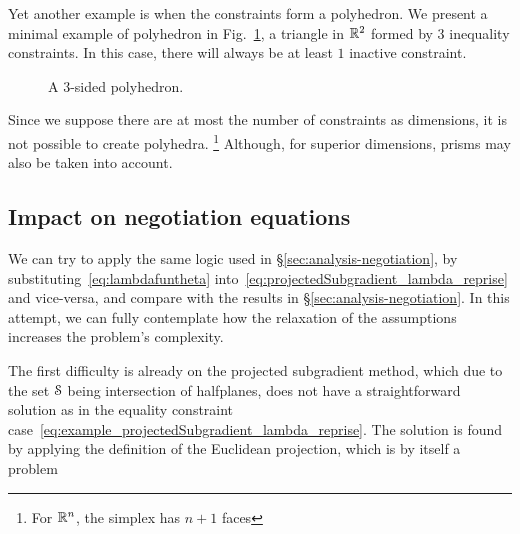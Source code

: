 \documentclass[../main.tex]{subfiles}
\begin{document}
Yet another example is when the constraints form a polyhedron.
We present a minimal example of polyhedron in Fig.~\ref{fig:triangle_inequality}, a triangle in $\mathbb{R}^{2}$ formed by $3$ inequality constraints.
In this case, there will always be at least $1$ inactive constraint.
\begin{figure}[h]
  \centering
  \caption{A $3$-sided polyhedron.}\label{fig:triangle_inequality}
\end{figure}

Since we suppose there are at most the number of constraints as dimensions, it is not possible to create polyhedra.
\footnote{For $\mathbb{R}^{n}$, the simplex has $n+1$ faces}
Although, for superior dimensions, prisms may also be taken into account.

\subsection{Impact on negotiation equations}\label{sec:impact-local-problem}
We can try to apply the same logic used in \S\ref{sec:analysis-negotiation}, by substituting~\eqref{eq:lambdafuntheta} into~\eqref{eq:projectedSubgradient_lambda_reprise} and vice-versa, and compare with the results in \S\ref{sec:analysis-negotiation}.
In this attempt, we can fully contemplate how the relaxation of the assumptions increases the problem's complexity.

The first difficulty is already on the projected subgradient method, which due to the set
$\mathcal{S}$ being intersection of halfplanes, does not have a straightforward solution as in the equality constraint case~\eqref{eq:example_projectedSubgradient_lambda_reprise}. The solution is found by applying the definition of the Euclidean projection, which is by itself a \qp{} problem
\end{document}
